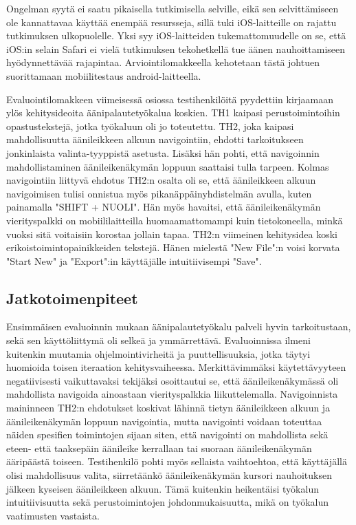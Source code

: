 \documentclass[utf8]{gradu3}
\begin{document}
Ongelman syytä ei saatu pikaisella tutkimisella selville, eikä sen selvittämiseen ole kannattavaa käyttää enempää resursseja, sillä tuki iOS-laitteille on rajattu tutkimuksen ulkopuolelle. Yksi syy iOS-laitteiden tukemattomuudelle on se, että iOS:in selain Safari ei vielä tutkimuksen tekohetkellä tue äänen nauhoittamiseen hyödynnettävää rajapintaa. Arviointilomakkeella kehotetaan tästä johtuen suorittamaan mobiilitestaus android-laitteella. 

Evaluointilomakkeen viimeisessä osiossa testihenkilöitä pyydettiin kirjaamaan ylös kehitysideoita äänipalautetyökalua koskien. TH1 kaipasi perustoimintoihin opastustekstejä, jotka työkaluun oli jo toteutettu. TH2, joka kaipasi mahdollisuutta äänileikkeen alkuun navigointiin, ehdotti tarkoitukseen jonkinlaista valinta-tyyppistä asetusta. Lisäksi hän pohti, että navigoinnin mahdollistaminen äänileikenäkymän loppuun saattaisi tulla tarpeen. Kolmas navigointiin liittyvä ehdotus TH2:n osalta oli se, että äänileikkeen alkuun navigoimisen tulisi onnistua myös pikanäppäinyhdistelmän avulla, kuten painamalla "SHIFT + NUOLI". Hän myös havaitsi, että äänileikenäkymän vierityspalkki on mobiililaitteilla huomaamattomampi kuin tietokoneella, minkä vuoksi sitä voitaisiin korostaa jollain tapaa. TH2:n viimeinen kehitysidea koski erikoistoimintopainikkeiden tekstejä. Hänen mielestä "New File":n voisi korvata "Start New" ja "Export":in käyttäjälle intuitiivisempi "Save". 

\subsection{Jatkotoimenpiteet}

Ensimmäisen evaluoinnin mukaan äänipalautetyökalu palveli hyvin tarkoitustaan, sekä sen käyttöliittymä oli selkeä ja ymmärrettävä. Evaluoinnissa ilmeni kuitenkin muutamia ohjelmointivirheitä ja puuttellisuuksia, jotka täytyi huomioida toisen iteraation kehitysvaiheessa. Merkittävimmäksi käytettävyyteen negatiivisesti vaikuttavaksi tekijäksi osoittautui se, että äänileikenäkymässä oli mahdollista navigoida ainoastaan vierityspalkkia liikuttelemalla. Navigoinnista maininneen TH2:n ehdotukset koskivat lähinnä tietyn äänileikkeen alkuun ja äänileikenäkymän loppuun navigointia, mutta navigointi voidaan toteuttaa näiden spesifien toimintojen sijaan siten, että navigointi on mahdollista sekä eteen- että taaksepäin äänileike kerrallaan tai suoraan äänileikenäkymän ääripäästä toiseen. Testihenkilö pohti myös sellaista vaihtoehtoa, että käyttäjällä olisi mahdollisuus valita, siirretäänkö äänileikenäkymän kursori nauhoituksen jälkeen kyseisen äänileikkeen alkuun. Tämä kuitenkin heikentäisi työkalun intuitiivisuutta sekä perustoimintojen johdonmukaisuutta, mikä on työkalun vaatimusten vastaista.
\end{document}
